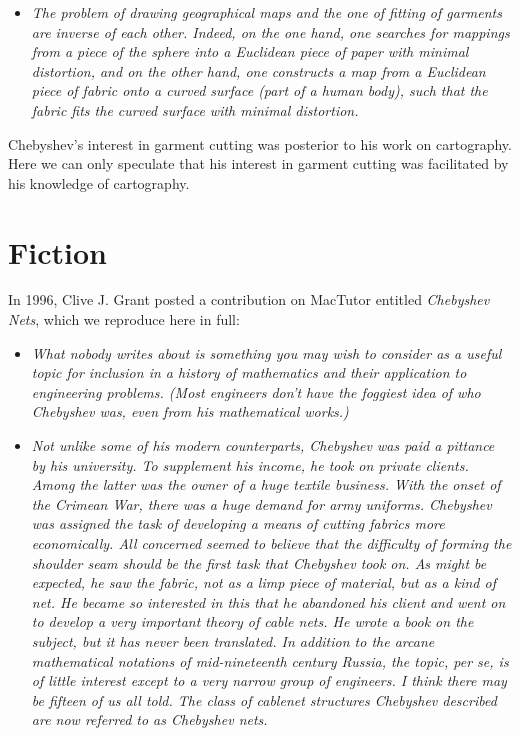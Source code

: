 \documentclass[12pt]{article}
\begin{document}
\begin{itemize}

\item[]{\it The problem of drawing geographical maps and the one of fitting of garments are inverse of each other. Indeed, on the one hand, one searches for mappings from a piece of the sphere into a Euclidean piece of paper with minimal distortion, and on the other hand, one constructs a map from a Euclidean piece of fabric onto a curved surface (part of a human body), such that the fabric fits the curved surface with minimal distortion.}

\end{itemize}

Chebyshev's interest in garment cutting was posterior to his work on cartography. Here we can only speculate that his interest in garment cutting was facilitated by his knowledge of cartography.

\section*{Fiction}

In 1996, Clive J. Grant \cite{Grant1996} posted a contribution on MacTutor entitled {\it Chebyshev Nets}, which we reproduce here in full:

\begin{itemize}

\item[]{\it What nobody writes about is something you may wish to consider as a useful topic for inclusion in a history of mathematics and their application to engineering problems. (Most engineers don't have the foggiest idea of who Chebyshev was, even from his mathematical works.)}

\item[]{\it Not unlike some of his modern counterparts, Chebyshev was paid a pittance by his university. To supplement his income, he took on private clients. Among the latter was the owner of a huge textile business. With the onset of the Crimean War, there was a huge demand for army uniforms. Chebyshev was assigned the task of developing a means of cutting fabrics more economically. All concerned seemed to believe that the difficulty of forming the shoulder seam should be the first task that Chebyshev took on. As might be expected, he saw the fabric, not as a limp piece of material, but as a kind of net. He became so interested in this that he abandoned his client and went on to develop a very important theory of cable nets. He wrote a book on the subject, but it has never been translated. In addition to the arcane mathematical notations of mid-nineteenth century Russia, the topic, per se, is of little interest except to a very narrow group of engineers. I think there may be fifteen of us all told. The class of cablenet structures Chebyshev described are now referred to as {\sc Chebyshev nets}.}

\end{itemize}
\end{document}
